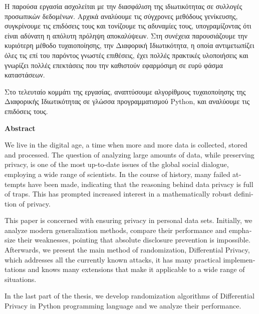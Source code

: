 \documentclass[a4paper, 11pt, twoside]{Thesis}  %
\begin{document}
Η παρούσα εργασία ασχολείται με την διασφάλιση της ιδιωτικότητας σε συλλογές προσωπικών δεδομένων. Αρχικά αναλύουμε τις σύγχρονες μεθόδους γενίκευσης, συγκρίνουμε τις επιδόσεις τους και τονίζουμε τις αδυναμίες τους, υπογραμίζοντας ότι είναι αδύνατη η απόλυτη πρόληψη αποκαλύψεων. Στη συνέχεια παρουσιάζουμε την κυριότερη μέθοδο τυχαιοποίησης, την Διαφορική Ιδιωτικότητα, η οποία αντιμετωπίζει όλες τις επί του παρόντος γνωστές επιθέσεις, έχει πολλές πρακτικές υλοποιήσεις και γνωρίζει πολλές επεκτάσεις που την καθιστούν εφαρμόσιμη σε ευρύ φάσμα καταστάσεων. 

Στο τελευταίο κομμάτι της εργασίας, αναπτύσουμε αλγορίθμους τυχαιοποίησης της Διαφορικής Ιδιωτικότητας σε γλώσσα προγραμματισμού \textlatin{Python}, και αναλύουμε τις επιδόσεις τους.



\null\vfill

\clearpage  %
\newpage
\thispagestyle{empty}
\mbox{}
\newpage


\null\vfill
\begin{center}
    \textbf{\Large{\textlatin{Abstract}}}
\end{center}

\textlatin{We live in the digital age, a time when more and more data is collected, stored and processed.
The question of analyzing large amounts of data, while preserving privacy, is one of the most up-to-date issues of the global social dialogue, employing a wide range of scientists.
In the course of history, many failed attempts have been made, indicating that the reasoning behind data privacy is full of traps. This has prompted increased interest in a mathematically robust definition of privacy.}

\textlatin{This paper is concerned with ensuring privacy in personal data sets. Initially, we analyze modern generalization methods, compare their performance and emphasize their weaknesses, pointing that absolute disclosure prevention is impossible. Afterwards, we present the main method of randomization, Differential Privacy, which addresses all the currently known attacks, it has many practical implementations and knows many extensions that make it applicable to a wide range of situations.}

\textlatin{In the last part of the thesis, we develop randomization algorithms of Differential Privacy in Python programming language and we analyze their performance.
}
\end{document}
